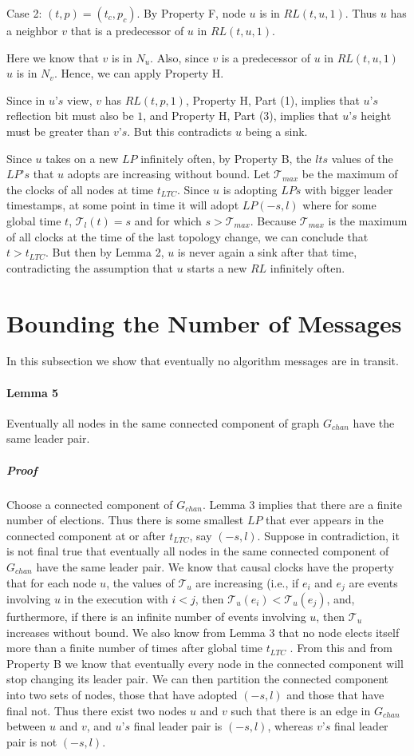 Case 2: $(t, p) = (t_c , p_c )$. By Property F, node $u$ is in $RL (t, u, 1)$. Thus $u$ has a neighbor $v$ that is a predecessor of $u$ in $RL (t, u, 1)$.

Here we know that $v$ is in $N_u$. Also, since $v$ is a predecessor of $u$ in $RL (t, u, 1)$ $u$ is in $N_v$. Hence, we can apply Property H.

Since in $u’s$ view, $v$ has $RL (t, p, 1)$, Property H, Part (1), implies that $u’s$ reflection bit must also be $1$, and Property H, Part (3), implies that $u’s$ height must be greater than $v’s$. But this contradicts $u$ being a sink.

Since $u$ takes on a new $LP$ infinitely often, by Property B, the $lts$ values of the $LP’s$ that $u$ adopts are increasing without bound. Let $\mathcal{T} _{max}$ be the maximum of the clocks of all nodes at time $t_{LTC}$. Since $u$ is adopting $LPs$ with bigger leader timestamps, at some point in time it will adopt $LP(-s, l)$ where for some global time $t$, $\mathcal{T}_l(t) = s$ and for which $s > \mathcal{T}_{max}$. Because $\mathcal{T}_{max}$ is the maximum of all clocks at the time of the last topology change, we can conclude that $t > t_{LTC}$. But then by Lemma 2, $u$ is never again a sink after that time, contradicting the assumption that $u$ starts a new $RL$ infinitely often.
\section{Bounding the Number of Messages}
In this subsection we show that eventually no algorithm messages are in transit.
\paragraph{Lemma 5} Eventually all nodes in the same connected component of graph $G_{chan}$ have the same leader pair.
\subparagraph{Proof}Choose a connected component of $G_{chan}$. Lemma 3 implies that there are a finite number of elections. Thus there is some smallest $LP$ that ever appears in the connected component at or after $t_{LTC}$, say $(-s, l)$. Suppose in contradiction, it is not final true that eventually all nodes in the same connected component of $G_{chan}$ have the same leader pair. We know that causal clocks have the property that for each node $u$, the values of $\mathcal{T} _u$ are increasing (i.e., if $e_i$ and $e_j$ are events involving $u$ in the execution with $i < j$, then $\mathcal{T} _u(e_i) < \mathcal{T} _u (e_j )$, and, furthermore, if there is an infinite number of events involving $u$, then $\mathcal{T}_u$ increases without bound. We also know from Lemma 3 that no node elects itself more than a finite number of times after global time $t_{LTC}$ . From this and from Property B we know that eventually every node in the connected component will stop changing its leader pair. We can then partition the connected component into two sets of nodes, those that have adopted $(-s, l)$ and those that have final not. Thus there exist two nodes $u$ and $v$ such that there is an edge in $G_{chan}$ between $u$ and $v$, and $u’s$ final leader pair is $(-s, l)$, whereas $v’s$ final leader pair is not $(-s, l)$.

